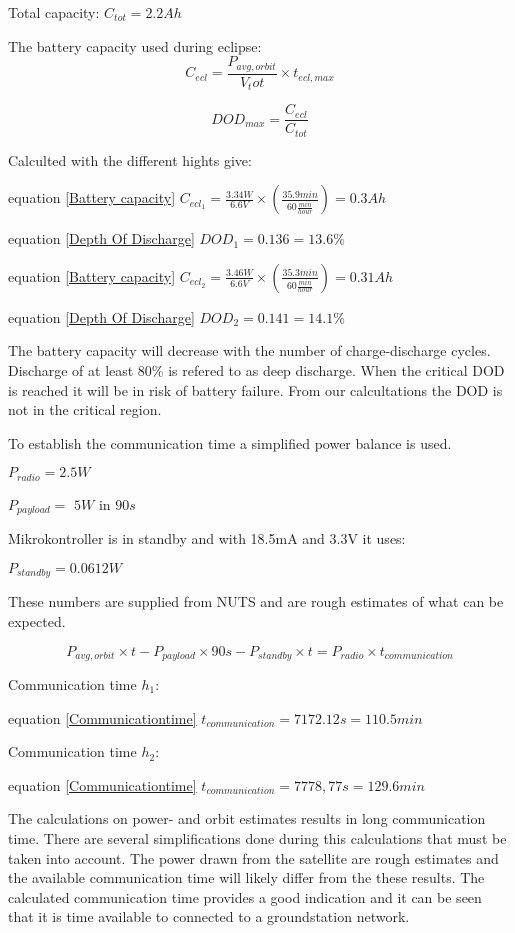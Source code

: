 \vspace{5 mm}Total capacity: $C_{tot} = 2.2 Ah$

The battery capacity used during eclipse: 
\begin{equation}
C_{ecl} = \frac{P_{avg,orbit}}{V_tot}\times t_{ecl,max}
\label{Battery capacity}
\end{equation}

 \begin{equation}
DOD_{max} = \frac{C_{ecl}}{C_{tot}}
\label{Depth Of Discharge}
\end{equation}

\vspace{5 mm}Calculted with the different hights give:

equation \ref{Battery capacity}
$C_{ecl_1} = \frac{3.34W}{6.6V}\times(\frac{35.9min}{60\frac{min}{hour}}) = 0.3Ah$

equation \ref{Depth Of Discharge}
$DOD_1 = 0.136 = 13.6 \%$

equation \ref{Battery capacity}
$C_{ecl_2} = \frac{3.46W}{6.6V}\times(\frac{35.3min}{60\frac{min}{hour}}) = 0.31 Ah$

equation \ref{Depth Of Discharge}
$DOD_2 = 0.141 = 14.1\%$

The battery capacity will decrease with the number of charge-discharge cycles. Discharge of at least 80\% is refered to as deep discharge. When the critical DOD is reached it will be in risk of battery failure. From our calcultations the DOD is not in the critical region. 

\vspace{5 mm}To establish the communication time a simplified power balance is used. 

\vspace{5 mm}$P_{radio} = 2.5 W$

$P_{payload} =$ $5 W$  in  $90s$

Mikrokontroller is in standby and with 18.5mA and 3.3V it uses:

$P_{standby} = 0.0612W$ 

These numbers are supplied from NUTS and are rough estimates of what can be expected.

\begin{equation} P_{avg,orbit}\times t - P_{payload}\times 90 s - P_{standby}\times t= P_{radio}\times t_{communication}
\label{Communicationtime}
\end{equation}

Communication time $h_1$:

equation \ref{Communicationtime}
$t_{communication} = 7172.12s =110.5 min$

Communication time $h_2$:

equation \ref{Communicationtime}
$t_{communication} = 7778,77s =129.6min$

The calculations on power- and orbit estimates results in long communication time. There are several simplifications done during this calculations that must be taken into account. The power drawn from the satellite are rough estimates and the available communication time will likely differ from the these results. The calculated communication time provides a good indication and it can be seen that it is time available to connected to a groundstation network.
